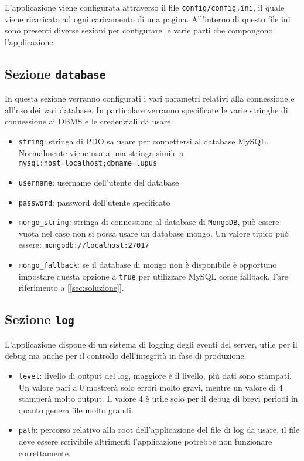 L'applicazione viene configurata attraverso il file \texttt{config/config.ini}, il quale viene ricaricato ad ogni caricamento di una pagina. All'interno di questo file ini sono presenti diverse sezioni per configurare le varie parti che compongono l'applicazione.

\subsection{Sezione \texttt{database}}
In questa sezione verranno configurati i vari parametri relativi alla connessione e all'uso dei vari database. In particolare verranno specificate le varie stringhe di connessione ai DBMS e le credenziali da usare.

\begin{itemize}
	\item \texttt{string}: stringa di PDO sa usare per connettersi al database MySQL. Normalmente viene usata una stringa simile a \texttt{mysql:host=localhost;dbname=lupus}
	\item \texttt{username}: username dell'utente del database
	\item \texttt{password}: password dell'utente specificato
	\item \texttt{mongo\_string}: stringa di connessione al database di \texttt{MongoDB}, può essere vuota nel caso non si possa usare un database mongo. Un valore tipico può essere: \texttt{mongodb://localhost:27017}
	\item \texttt{mongo\_fallback}: se il database di mongo non è disponibile è opportuno impostare questa opzione a \texttt{true} per utilizzare MySQL come fallback. Fare riferimento a [\ref{sec:soluzione}].
\end{itemize}


\subsection{Sezione \texttt{log}}

L'applicazione dispone di un sistema di logging degli eventi del server, utile per il debug ma anche per il controllo dell'integrità in fase di produzione.

\begin{itemize}
	\item \texttt{level}: livello di output del log, maggiore è il livello, più dati sono stampati. Un valore pari a 0 mostrerà solo errori molto gravi, mentre un valore di 4 stamperà molto output. Il valore 4 è utile solo per il debug di brevi periodi in quanto genera file molto grandi.
	\item \texttt{path}: percorso relativo alla root dell'applicazione del file di log da usare, il file deve essere scrivibile altrimenti l'applicazione potrebbe non funzionare correttamente.
\end{itemize}


